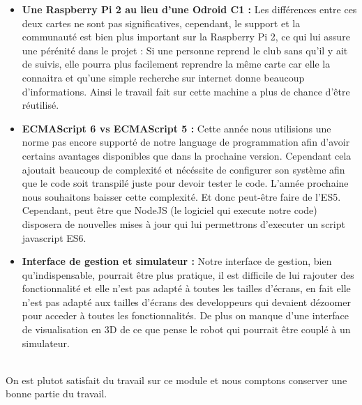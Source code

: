 	\begin{itemize}
		\item \textbf{Une Raspberry Pi 2 au lieu d'une Odroid C1 :} Les différences entre ces deux cartes ne sont pas significatives, cependant, le support et la communauté est bien plus important sur la Raspberry Pi 2, ce qui lui assure une pérénité dans le projet : Si une personne reprend le club sans qu'il y ait de suivis, elle pourra plus facilement reprendre la même carte car elle la connaitra et qu'une simple recherche sur internet donne beaucoup d'informations. Ainsi le travail fait sur cette machine a plus de chance d'être réutilisé.
		\item \textbf{ECMAScript 6 vs ECMAScript 5 :} Cette année nous utilisions une norme pas encore supporté de notre language de programmation afin d'avoir certains avantages disponibles que dans la prochaine version. Cependant cela ajoutait beaucoup de complexité et nécéssite de configurer son système afin que le code soit transpilé juste pour devoir tester le code. L'année prochaine nous souhaitons baisser cette complexité. Et donc peut-être faire de l'ES5. Cependant, peut être que NodeJS (le logiciel qui execute notre code) disposera de nouvelles mises à jour qui lui permettrons d'executer un script javascript ES6.
		\item \textbf{Interface de gestion et simulateur :} Notre interface de gestion, bien qu'indispensable, pourrait être plus pratique, il est difficile de lui rajouter des fonctionnalité et elle n'est pas adapté à toutes les tailles d'écrans, en fait elle n'est pas adapté aux tailles d'écrans des developpeurs qui devaient dézoomer pour acceder à toutes les fonctionnalités. De plus on manque d'une interface de visualisation en 3D de ce que pense le robot qui pourrait être couplé à un simulateur.
	\end{itemize}
	\ \\
	On est plutot satisfait du travail sur ce module et nous comptons conserver une bonne partie du travail.